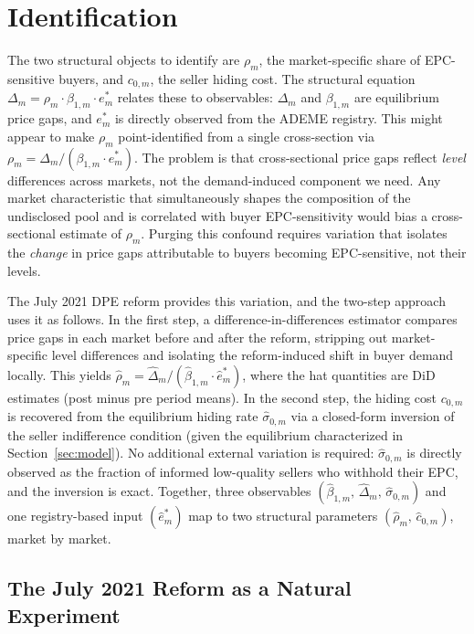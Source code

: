 \documentclass[10pt,letterpaper]{bp-template-concise}
\begin{document}
\section{Identification}
\label{sec:identification}

The two structural objects to identify are $\rho_m$, the market-specific share of EPC-sensitive buyers, and $c_{0,m}$, the seller hiding cost. The structural equation $\Delta_m = \rho_m \cdot \beta_{1,m} \cdot e^*_m$ relates these to observables: $\Delta_m$ and $\beta_{1,m}$ are equilibrium price gaps, and $e^*_m$ is directly observed from the ADEME registry. This might appear to make $\rho_m$ point-identified from a single cross-section via $\rho_m = \Delta_m / (\beta_{1,m} \cdot e^*_m)$. The problem is that cross-sectional price gaps reflect \emph{level} differences across markets, not the demand-induced component we need. Any market characteristic that simultaneously shapes the composition of the undisclosed pool and is correlated with buyer EPC-sensitivity would bias a cross-sectional estimate of $\rho_m$. Purging this confound requires variation that isolates the \emph{change} in price gaps attributable to buyers becoming EPC-sensitive, not their levels.

The July 2021 DPE reform provides this variation, and the two-step approach uses it as follows. In the first step, a difference-in-differences estimator compares price gaps in each market before and after the reform, stripping out market-specific level differences and isolating the reform-induced shift in buyer demand locally. This yields $\hat\rho_m = \hat\Delta_m / (\hat\beta_{1,m} \cdot \hat{e}^*_m)$, where the hat quantities are DiD estimates (post minus pre period means). In the second step, the hiding cost $c_{0,m}$ is recovered from the equilibrium hiding rate $\hat\sigma_{0,m}$ via a closed-form inversion of the seller indifference condition (given the equilibrium characterized in Section~\ref{sec:model}). No additional external variation is required: $\hat\sigma_{0,m}$ is directly observed as the fraction of informed low-quality sellers who withhold their EPC, and the inversion is exact. Together, three observables $(\hat\beta_{1,m},\,\hat\Delta_m,\,\hat\sigma_{0,m})$ and one registry-based input $(\hat{e}^*_m)$ map to two structural parameters $(\hat\rho_m,\,\hat{c}_{0,m})$, market by market.

\subsection{The July 2021 Reform as a Natural Experiment}
\end{document}
